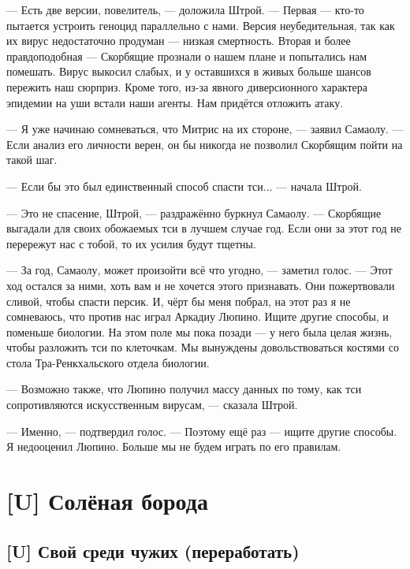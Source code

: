 --- Есть две версии, повелитель, --- доложила Штрой.
--- Первая --- кто-то пытается устроить геноцид параллельно с нами.
Версия неубедительная, так как их вирус недостаточно продуман --- низкая смертность.
Вторая и более правдоподобная --- Скорбящие прознали о нашем плане и попытались нам помешать.
Вирус выкосил слабых, и у оставшихся в живых больше шансов пережить наш сюрприз.
Кроме того, из-за явного диверсионного характера эпидемии на уши встали наши агенты.
Нам придётся отложить атаку.

--- Я уже начинаю сомневаться, что Митрис на их стороне, --- заявил Самаолу.
--- Если анализ его личности верен, он бы никогда не позволил Скорбящим пойти на такой шаг.

--- Если бы это был единственный способ спасти тси... --- начала Штрой.

--- Это не спасение, Штрой, --- раздражённо буркнул Самаолу.
--- Скорбящие выгадали для своих обожаемых тси в лучшем случае год.
Если они за этот год не перережут нас с тобой, то их усилия будут тщетны.

--- За год, Самаолу, может произойти всё что угодно, --- заметил голос.
--- Этот ход остался за ними, хоть вам и не хочется этого признавать.
Они пожертвовали сливой, чтобы спасти персик\FM.
И, чёрт бы меня побрал, на этот раз я не сомневаюсь, что против нас играл Аркадиу Люпино.
Ищите другие способы, и поменьше биологии.
На этом поле мы пока позади --- у него была целая жизнь, чтобы разложить тси по клеточкам.
Мы вынуждены довольствоваться костями со стола Тра-Ренкхальского отдела биологии.

--- Возможно также, что Люпино получил массу данных по тому, как тси сопротивляются искусственным вирусам, --- сказала Штрой.

--- Именно, --- подтвердил голос.
--- Поэтому ещё раз --- ищите другие способы.
Я недооценил Люпино.
Больше мы не будем играть по его правилам.

\textspace

\chapter{[U] Солёная борода}


\section{[U] Свой среди чужих (переработать)}

